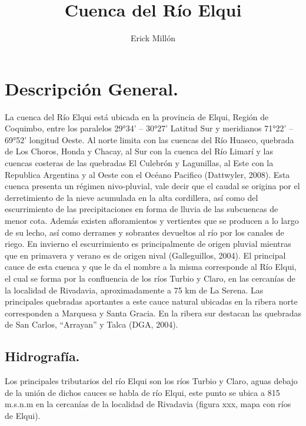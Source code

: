\documentclass[10pt]{article}
\title{Cuenca del Río Elqui}
\author{Erick Millón}
\begin{document}
\maketitle

\section{Descripción General.}
La cuenca del Río Elqui está ubicada en la provincia de Elqui, Región de Coquimbo, entre los paralelos 29°34’ – 30°27’ Latitud Sur y meridianos 71°22’ – 69°52’ longitud Oeste. Al norte limita con las cuencas del Río Huasco, quebrada de Los Choros, Honda y Chacay, al Sur con la cuenca del Río Limarí y las cuencas  costeras de las quebradas El Culebrón y Lagunillas, al Este con la Republica Argentina y al Oeste con el Océano Pacifico (Dattwyler, 2008).
Esta cuenca presenta un régimen nivo-pluvial, vale decir que el caudal se origina por el derretimiento de la nieve acumulada en la alta cordillera, así como del escurrimiento de las precipitaciones en forma de lluvia de las subcuencas de menor cota. Además existen afloramientos y vertientes que se producen a lo largo de su lecho, así como derrames y sobrantes devueltos al río por los canales de riego. En invierno el escurrimiento es principalmente de origen pluvial  mientras que en primavera y verano es de origen nival (Galleguillos, 2004).
El principal cauce de esta cuenca y que le da el nombre a la misma corresponde al Río Elqui, el cual se forma por la confluencia de los ríos Turbio y Claro, en las cercanías de la localidad de Rivadavia, aproximadamente a 75 km de La Serena. Las principales quebradas aportantes a este cauce natural ubicadas en la ribera norte corresponden a Marquesa y Santa Gracia. En la ribera sur destacan las quebradas de San Carlos, “Arrayan” y Talca (DGA, 2004).

\subsection{Hidrografía.}
Los principales tributarios del río Elqui son los ríos Turbio y Claro, aguas debajo de la unión de dichos cauces se habla de río Elqui, este punto se ubica a 815 m.s.n.m en la cercanías de la localidad de Rivadavia (figura xxx, mapa con ríos de Elqui).
\end{document}
